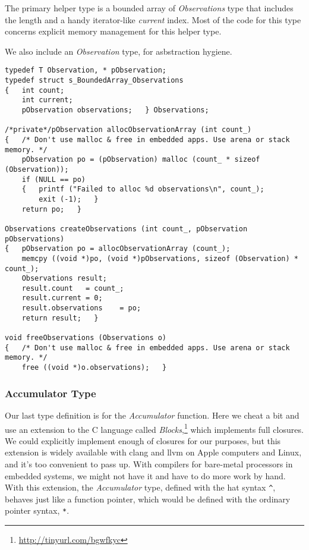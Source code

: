 \documentclass[10pt,oneside,x11names]{article}
\begin{document}
The primary helper type is a bounded array of \emph{Observations} type that includes
the length and a handy iterator-like \emph{current} index. Most of the code for this
type concerns explicit memory management for this helper type.

We also include an \emph{Observation} type, for asbstraction hygiene. 

\begin{verbatim}
typedef T Observation, * pObservation;
typedef struct s_BoundedArray_Observations
{   int count;
    int current;
    pObservation observations;   } Observations;

/*private*/pObservation allocObservationArray (int count_)
{   /* Don't use malloc & free in embedded apps. Use arena or stack memory. */
    pObservation po = (pObservation) malloc (count_ * sizeof (Observation));
    if (NULL == po)
    {   printf ("Failed to alloc %d observations\n", count_);
        exit (-1);   }
    return po;   }

Observations createObservations (int count_, pObservation pObservations)
{   pObservation po = allocObservationArray (count_);
    memcpy ((void *)po, (void *)pObservations, sizeof (Observation) * count_);
    Observations result;
    result.count   = count_;
    result.current = 0;
    result.observations    = po;
    return result;   }

void freeObservations (Observations o)
{   /* Don't use malloc & free in embedded apps. Use arena or stack memory. */
    free ((void *)o.observations);   }
\end{verbatim}

\subsubsection{Accumulator Type}
\label{sec:orgheadline8}

Our last type definition is for the \emph{Accumulator} function. Here we cheat a bit
and use an extension to the C language called \emph{Blocks},\footnote{\url{http://tinyurl.com/bgwfkyc}} which
implements full closures. We could explicitly implement enough of closures for
our purposes, but this extension is widely available with clang and llvm on
Apple computers and Linux, and it's too convenient to pass up. With compilers
for bare-metal processors in embedded systems, we might not have it and have to
do more work by hand. With this extension, the \emph{Accumulator} type, defined with
the hat syntax \texttt{\textasciicircum{}}, behaves just like a function pointer, which would be defined
with the ordinary pointer syntax, \texttt{*}.
\end{document}
